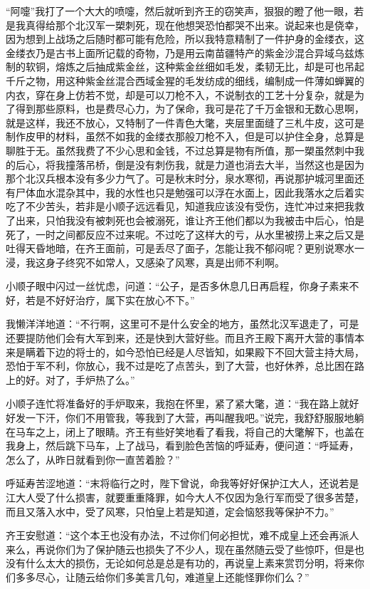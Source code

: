 “阿嚏”我打了一个大大的喷嚏，然后就听到齐王的窃笑声，狠狠的瞪了他一眼，若是我真得给那个北汉军一槊刺死，现在他想哭恐怕都哭不出来。说起来也是侥幸，因为想到上战场之后随时都可能有危险，所以我特意精制了一件护身的金缕衣，这金缕衣乃是古书上面所记载的奇物，乃是用云南苗疆特产的紫金沙混合异域乌兹炼制的软铜，熔炼之后抽成紫金丝，这种紫金丝细如毛发，柔韧无比，却是可也吊起千斤之物，用这种紫金丝混合西域金猩的毛发纺成的细线，编制成一件薄如蝉翼的内衣，穿在身上仿若不觉，却是可以刀枪不入，不说制衣的工艺十分复杂，就是为了得到那些原料，也是费尽心力，为了保命，我可是花了千万金银和无数心思啊，就是这样，我还不放心，又特制了一件青色大氅，夹层里面缝了三札牛皮，这可是制作皮甲的材料，虽然不如我的金缕衣那般刀枪不入，但是可以护住全身，总算是聊胜于无。虽然我费了不少心思和金钱，不过总算是物有所值，那一槊虽然刺中我的后心，将我撞落吊桥，倒是没有刺伤我，就是力道也消去大半，当然这也是因为那个北汉兵根本没有多少力气了。可是秋末时分，泉水寒彻，再说那护城河里面还有尸体血水混杂其中，我的水性也只是勉强可以浮在水面上，因此我落水之后着实吃了不少苦头，若非是小顺子远远看见，知道我应该没有受伤，连忙冲过来把我救了出来，只怕我没有被刺死也会被溺死，谁让齐王他们都以为我被击中后心，怕是死了，一时之间都反应不过来呢。不过吃了这样大的亏，从水里被捞上来之后又是吐得天昏地暗，在齐王面前，可是丢尽了面子，怎能让我不郁闷呢？更别说寒水一浸，我这身子终究不如常人，又感染了风寒，真是出师不利啊。

小顺子眼中闪过一丝忧虑，问道：“公子，是否多休息几日再启程，你身子素来不好，若是不好好治疗，属下实在放心不下。”

我懒洋洋地道：“不行啊，这里可不是什么安全的地方，虽然北汉军退走了，可是还要提防他们会有大军到来，还是快到大营好些。而且齐王殿下离开大营的事情本来是瞒着下边的将士的，如今恐怕已经是人尽皆知，如果殿下不回大营主持大局，恐怕于军不利，你放心，我不过是吃了点苦头，到了大营，也好休养，总比困在路上的好。对了，手炉热了么。”

小顺子连忙将准备好的手炉取来，我抱在怀里，紧了紧大氅，道：“我在路上就好好发一下汗，你们不用管我，等我到了大营，再叫醒我吧。”说完，我舒舒服服地躺在马车之上，闭上了眼睛。齐王有些好笑地看了看我，将自己的大氅解下，也盖在我身上，然后跳下马车，上了战马，看到脸色苦恼的呼延寿，便问道：“呼延寿，怎么了，从昨日就看到你一直苦着脸？”

呼延寿苦涩地道：“末将临行之时，陛下曾说，命我等好好保护江大人，还说若是江大人受了什么损害，就要重重降罪，如今大人不仅因为急行军而受了很多苦楚，而且又落入水中，受了风寒，只怕皇上若是知道，定会恼怒我等保护不力。”

齐王安慰道：“这个本王也没有办法，不过你们何必担忧，难不成皇上还会再派人来么，再说你们为了保护随云也损失了不少人，现在虽然随云受了些惊吓，但是也没有什么太大的损伤，无论如何总是总是有功的，再说皇上素来赏罚分明，将来你们多多尽心，让随云给你们多美言几句，难道皇上还能怪罪你们么？”

